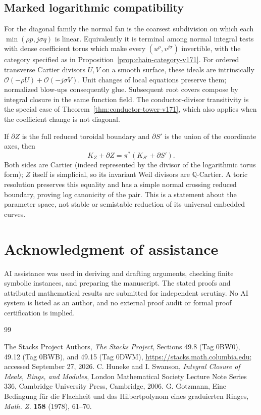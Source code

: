\documentclass[11pt,reqno]{amsart}
\numberwithin{equation}{section}
\theoremstyle{definition}\newtheorem{definition}[theorem]{Definition}
\theoremstyle{remark}\newtheorem{remark}[theorem]{Remark}
\newcommand{\OO}{\mathcal O}\newcommand{\II}{\mathcal I}
\begin{document}
\subsection{Marked logarithmic compatibility}
For the diagonal family the normal fan is the coarsest subdivision
on which each $\min(\rho p,j\sigma q)$ is linear. Equivalently it
is terminal among normal integral tests with dense coefficient torus
which make every $(u^\rho,v^{j\sigma})$ invertible, with the category
specified as in Proposition~\ref{prop:chain-category-v171}.
For ordered transverse Cartier divisors $U,V$ on a smooth surface,
these ideals are intrinsically
$\OO(-\rho U)+\OO(-j\sigma V)$. Unit changes of local equations
preserve them; normalized blow-ups consequently glue. Subsequent
root covers compose by integral closure in the same function field.
The conductor-divisor transitivity is the special case of
Theorem~\ref{thm:conductor-tower-v171}, which also applies when the
coefficient change is not diagonal.

If $\partial Z$ is the full reduced toroidal boundary and
$\partial S'$ is the union of the coordinate axes, then
\[
 K_Z+\partial Z=\pi^*(K_{S'}+\partial S').
\]
Both sides are Cartier (indeed represented by the divisor of the
logarithmic torus form); $Z$ itself is simplicial, so its invariant
Weil divisors are $\mathbb Q$-Cartier. A toric resolution preserves
this equality and has a simple normal crossing reduced boundary,
proving log canonicity of the pair. This is a statement about the
parameter space, not stable or semistable reduction of its universal
embedded curves.


\section*{Acknowledgment of assistance}
AI assistance was used in deriving and drafting arguments, checking
finite symbolic instances, and preparing the manuscript. The stated
proofs and attributed mathematical results are submitted for
independent scrutiny. No AI system is listed as an author, and no
external proof audit or formal proof certification is implied.

\begin{thebibliography}{99}

The Stacks Project Authors, \emph{The Stacks Project},
Sections 49.8 (Tag 0BW0), 49.12 (Tag 0BWB), and 49.15 (Tag 0DWM),
\url{https://stacks.math.columbia.edu}; accessed September 27, 2026.
C. Huneke and I. Swanson, \emph{Integral Closure of Ideals, Rings,
and Modules}, London Mathematical Society Lecture Note Series 336,
Cambridge University Press, Cambridge, 2006.
G. Gotzmann, Eine Bedingung f\"ur die Flachheit und das Hilbertpolynom
eines graduierten Ringes, \emph{Math. Z.} \textbf{158} (1978), 61--70.

\end{thebibliography}
\end{document}
